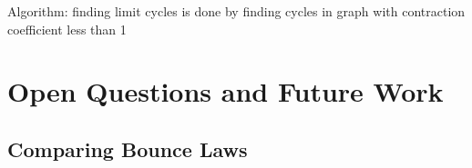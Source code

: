 \documentclass[]{styles/svproc}  %
\begin{document}
Algorithm: finding limit cycles is done by finding cycles in graph with
contraction coefficient less than 1

%
%
%
%
%
%
%
%



\section{Open Questions and Future Work}

\subsection{Comparing Bounce Laws}
\end{document}
